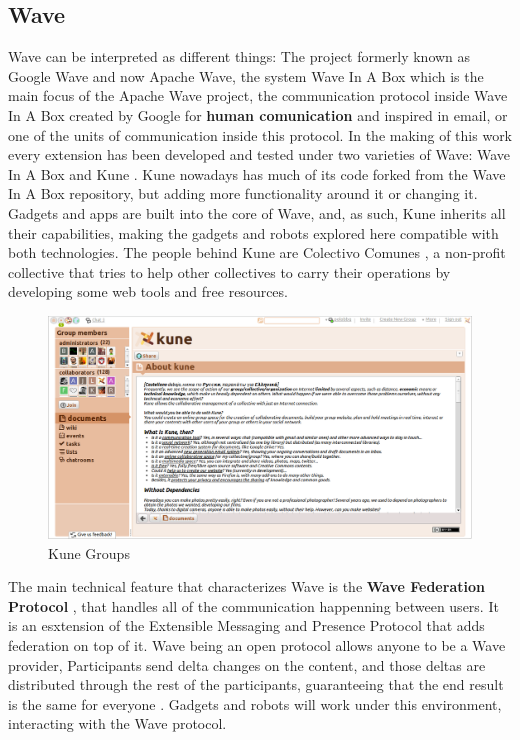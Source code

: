 \subsection{Wave}
Wave can be interpreted as different things: The project formerly known as Google Wave and now Apache Wave, the system Wave In A Box which is the main focus of the Apache Wave project, the communication protocol inside Wave In A Box created by Google for \textbf{human comunication} and inspired in email, or one of the units of communication inside this protocol. In the making of this work every extension has been developed and tested under two varieties of Wave: Wave In A Box and Kune \cite{ref:kune}. Kune nowadays has much of its code forked from the Wave In A Box repository, but adding more functionality around it or changing it. Gadgets and apps are built into the core of Wave, and, as such, Kune inherits all their capabilities, making the gadgets and robots explored here compatible with both technologies. The people behind Kune are Colectivo Comunes \cite{ref:comunes}, a non-profit collective that tries to help other collectives to carry their operations by developing some web tools and free resources.
\begin{figure}[H]
  \center
    \includegraphics[keepaspectratio, scale=0.26]{Media/Captures/Wave/Kune_Groups.png}
  \caption{Kune Groups}
  \label{fig:kune_groups}
\end{figure}
The main technical feature that characterizes Wave is the \textbf{Wave Federation Protocol} \cite{ref:wave_federated_protocol}, that handles all of the communication happenning between users. It is an esxtension of the Extensible Messaging and Presence Protocol \cite{ref:xmpp} that adds federation on top of it. Wave being an open protocol allows anyone to be a Wave provider, Participants send delta changes on the content, and those deltas are distributed through the rest of the participants, guaranteeing that the end result is the same for everyone \cite{ref:federating_websites_google_wave}. Gadgets and robots will work under this environment, interacting with the Wave protocol.

